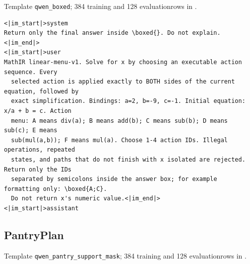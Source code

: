 \documentclass{article}
\newcommand{\1}{\mathbf 1}
\theoremstyle{remark}
\theoremstyle{definition}
\theoremstyle{plain}
\begin{document}
\noindent Template \texttt{qwen\_boxed}; 384 training and 128 evaluation\linebreak rows in .

\begin{Verbatim}[fontsize=\scriptsize,frame=single,framesep=4pt,rulecolor=\color{black!25}]
<|im_start|>system
Return only the final answer inside \boxed{}. Do not explain.<|im_end|>
<|im_start|>user
MathIR linear-menu-v1. Solve for x by choosing an executable action sequence. Every
  selected action is applied exactly to BOTH sides of the current equation, followed by
  exact simplification. Bindings: a=2, b=-9, c=-1. Initial equation: x/a + b = c. Action
  menu: A means div(a); B means add(b); C means sub(b); D means sub(c); E means
  sub(mul(a,b)); F means mul(a). Choose 1-4 action IDs. Illegal operations, repeated
  states, and paths that do not finish with x isolated are rejected. Return only the IDs
  separated by semicolons inside the answer box; for example formatting only: \boxed{A;C}.
  Do not return x's numeric value.<|im_end|>
<|im_start|>assistant
\end{Verbatim}

\subsection{PantryPlan}
\label{app:prompt-pantry}

\noindent Template \texttt{qwen\_pantry\_support\_mask}; 384 training and 128 evaluation\linebreak rows in .
\end{document}
